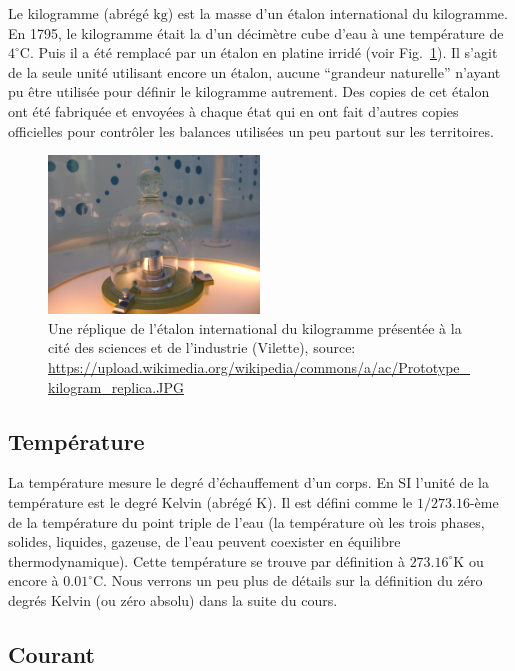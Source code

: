 \documentclass[a4paper,12pt]{book}
\newcommand{\kg}{\mathrm{kg}}
\newcommand{\K}{\mathrm{K}}
\newcommand{\C}{\mathrm{C}}
\begin{document}
Le kilogramme (abrégé $\kg$) est la masse d'un étalon international du kilogramme. En 1795, le kilogramme était la d'un décimètre cube 
d'eau à une température de $4^\circ\C$. Puis il a été remplacé par un étalon en platine irridé (voir Fig.~\ref{fig_kg}). Il s'agit de la seule unité utilisant encore un étalon, 
aucune ``grandeur naturelle'' n'ayant pu être utilisée pour définir le kilogramme autrement. Des copies de cet étalon ont été fabriquée et envoyées à
chaque état qui en ont fait d'autres copies officielles pour contrôler les balances utilisées un peu partout sur les territoires.
\begin{figure}
\begin{center}
\includegraphics[width=0.5\textwidth]{figs/kilogram_replica.jpg}
\caption{Une réplique de l'étalon international du kilogramme présentée à la cité des sciences et de l'industrie (Vilette), source: \url{https://upload.wikimedia.org/wikipedia/commons/a/ac/Prototype_kilogram_replica.JPG}}
\label{fig_kg}
\end{center}
\end{figure}

\subsection{Température}

La température mesure le degré d'échauffement d'un corps. En SI l'unité de la température est le degré Kelvin (abrégé $\K$).
Il est défini comme le $1/273.16$-ème de la température du point triple de l'eau (la température où les trois phases, solides, liquides, gazeuse, de l'eau 
peuvent coexister en équilibre thermodynamique). Cette température se trouve par définition à $273.16^\circ\K$ ou encore à $0.01^\circ\C$.
Nous verrons un peu plus de détails sur la définition du zéro degrés Kelvin (ou zéro absolu) dans la suite du cours.

\subsection{Courant}
\end{document}
